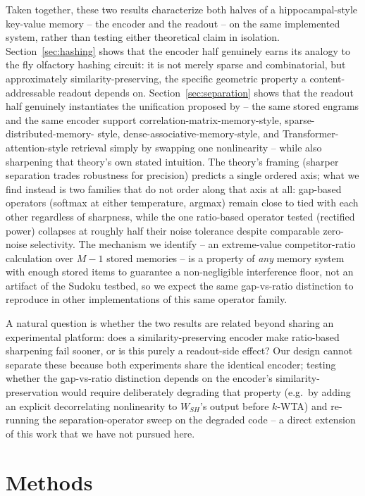\documentclass[11pt]{article}
\begin{document}
Taken together, these two results characterize both halves of a hippocampal-style key-value
memory -- the encoder and the readout -- on the same implemented system, rather than testing
either theoretical claim in isolation. Section~\ref{sec:hashing} shows that the encoder half
genuinely earns its analogy to the fly olfactory hashing circuit: it is not merely sparse and
combinatorial, but approximately similarity-preserving, the specific geometric property a
content-addressable readout depends on. Section~\ref{sec:separation} shows that the readout
half genuinely instantiates the unification proposed by \cite{gershman2025} -- the same stored
engrams and the same encoder support correlation-matrix-memory-style, sparse-distributed-memory-
style, dense-associative-memory-style, and Transformer-attention-style retrieval simply by
swapping one nonlinearity -- while also sharpening that theory's own stated intuition. The
theory's framing (sharper separation trades robustness for precision) predicts a single
ordered axis; what we find instead is two families that do not order along that axis at all:
gap-based operators (softmax at either temperature, argmax) remain close to tied with each
other regardless of sharpness, while the one ratio-based operator tested (rectified power)
collapses at roughly half their noise tolerance despite comparable zero-noise selectivity. The
mechanism we identify -- an extreme-value competitor-ratio calculation over $M-1$ stored
memories -- is a property of \emph{any} memory system with enough stored items to guarantee a
non-negligible interference floor, not an artifact of the Sudoku testbed, so we expect the same
gap-vs-ratio distinction to reproduce in other implementations of this same operator family.

A natural question is whether the two results are related beyond sharing an experimental
platform: does a similarity-preserving encoder make ratio-based sharpening fail sooner, or is
this purely a readout-side effect? Our design cannot separate these because both experiments
share the identical encoder; testing whether the gap-vs-ratio distinction depends on the
encoder's similarity-preservation would require deliberately degrading that property (e.g.\ by
adding an explicit decorrelating nonlinearity to $W_{SH}$'s output before $k$-WTA) and
re-running the separation-operator sweep on the degraded code -- a direct extension of this
work that we have not pursued here.

\section{Methods}
\end{document}
